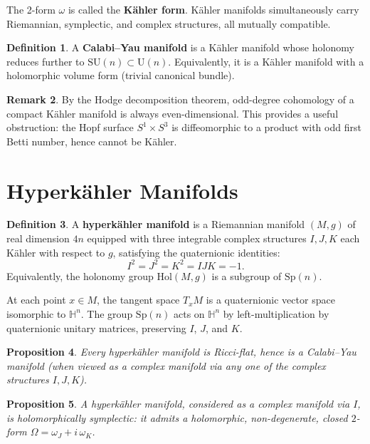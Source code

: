 \documentclass[12pt]{article}
\theoremstyle{definition}
\newtheorem{definition}{Definition}[section]
\newtheorem{remark}[definition]{Remark}
\theoremstyle{plain}
\newtheorem{proposition}[definition]{Proposition}
\newcommand{\HH}{\mathbb{H}}
\newcommand{\Sp}{\mathrm{Sp}}
\newcommand{\SU}{\mathrm{SU}}
\newcommand{\U}{\mathrm{U}}
\newcommand{\Hol}{\mathrm{Hol}}
\begin{document}
The 2-form $\omega$ is called the \textbf{K\"{a}hler form}. K\"{a}hler manifolds simultaneously carry Riemannian, symplectic, and complex structures, all mutually compatible.

\begin{definition}
A \textbf{Calabi--Yau manifold} is a K\"{a}hler manifold whose holonomy reduces further to $\SU(n) \subset \U(n)$. Equivalently, it is a K\"{a}hler manifold with a holomorphic volume form (trivial canonical bundle).
\end{definition}

\begin{remark}
By the Hodge decomposition theorem, odd-degree cohomology of a compact K\"{a}hler manifold is always even-dimensional. This provides a useful obstruction: the Hopf surface $S^1 \times S^3$ is diffeomorphic to a product with odd first Betti number, hence cannot be K\"{a}hler.
\end{remark}

\section{Hyperk\"{a}hler Manifolds}

\begin{definition}
A \textbf{hyperk\"{a}hler manifold} is a Riemannian manifold $(M, g)$ of real dimension $4n$ equipped with three integrable complex structures $I, J, K$ each K\"{a}hler with respect to $g$, satisfying the quaternionic identities:
\[
I^2 = J^2 = K^2 = IJK = -1.
\]
Equivalently, the holonomy group $\Hol(M, g)$ is a subgroup of $\Sp(n)$.
\end{definition}

At each point $x \in M$, the tangent space $T_x M$ is a quaternionic vector space isomorphic to $\HH^n$. The group $\Sp(n)$ acts on $\HH^n$ by left-multiplication by quaternionic unitary matrices, preserving $I$, $J$, and $K$.

\begin{proposition}
Every hyperk\"{a}hler manifold is Ricci-flat, hence is a Calabi--Yau manifold (when viewed as a complex manifold via any one of the complex structures $I, J, K$).
\end{proposition}

\begin{proposition}
A hyperk\"{a}hler manifold, considered as a complex manifold via $I$, is holomorphically symplectic: it admits a holomorphic, non-degenerate, closed $2$-form $\Omega = \omega_J + i\,\omega_K$.
\end{proposition}
\end{document}
